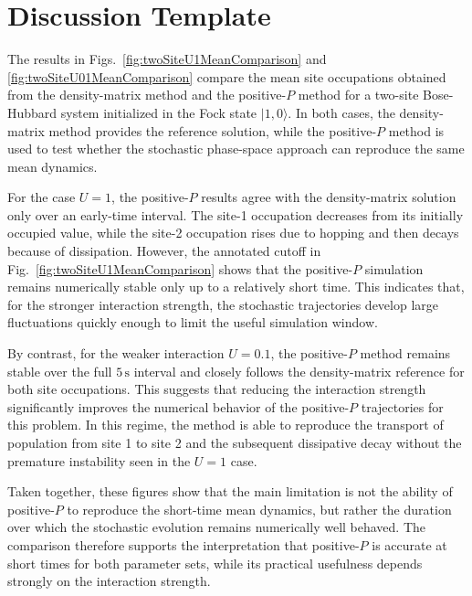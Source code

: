 \documentclass[12pt]{article}
\begin{document}
\section*{Discussion Template}

The results in Figs.~\ref{fig:twoSiteU1MeanComparison} and \ref{fig:twoSiteU01MeanComparison} compare the mean site occupations obtained from the density-matrix method and the positive-$P$ method for a two-site Bose-Hubbard system initialized in the Fock state $|1,0\rangle$. In both cases, the density-matrix method provides the reference solution, while the positive-$P$ method is used to test whether the stochastic phase-space approach can reproduce the same mean dynamics.

For the case $U=1$, the positive-$P$ results agree with the density-matrix solution only over an early-time interval. The site-1 occupation decreases from its initially occupied value, while the site-2 occupation rises due to hopping and then decays because of dissipation. However, the annotated cutoff in Fig.~\ref{fig:twoSiteU1MeanComparison} shows that the positive-$P$ simulation remains numerically stable only up to a relatively short time. This indicates that, for the stronger interaction strength, the stochastic trajectories develop large fluctuations quickly enough to limit the useful simulation window.

By contrast, for the weaker interaction $U=0.1$, the positive-$P$ method remains stable over the full $5\,\mathrm{s}$ interval and closely follows the density-matrix reference for both site occupations. This suggests that reducing the interaction strength significantly improves the numerical behavior of the positive-$P$ trajectories for this problem. In this regime, the method is able to reproduce the transport of population from site 1 to site 2 and the subsequent dissipative decay without the premature instability seen in the $U=1$ case.

Taken together, these figures show that the main limitation is not the ability of positive-$P$ to reproduce the short-time mean dynamics, but rather the duration over which the stochastic evolution remains numerically well behaved. The comparison therefore supports the interpretation that positive-$P$ is accurate at short times for both parameter sets, while its practical usefulness depends strongly on the interaction strength.
\end{document}

